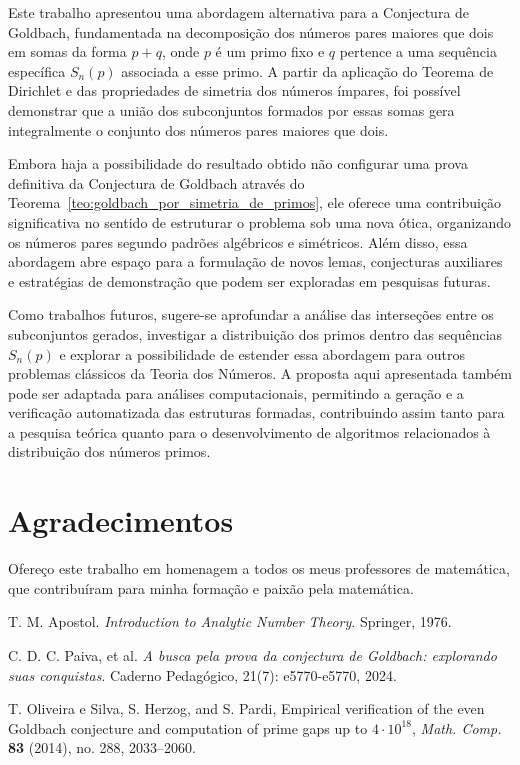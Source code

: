 \documentclass[a4paper,11pt]{article}
\theoremstyle{definition}
\theoremstyle{remark}
\begin{document}
\begin{otherlanguage}{brazil}
	Este trabalho apresentou uma abordagem alternativa para a Conjectura de Goldbach, fundamentada na decomposição dos números pares maiores que dois em somas da forma \(p + q\), onde \(p\) é um primo fixo e \(q\) pertence a uma sequência específica \(S_n(p)\) associada a esse primo. A partir da aplicação do Teorema de Dirichlet e das propriedades de simetria dos números ímpares, foi possível demonstrar que a união dos subconjuntos formados por essas somas gera integralmente o conjunto dos números pares maiores que dois.
	
	Embora haja a possibilidade do resultado obtido não configurar uma prova definitiva da Conjectura de Goldbach através do Teorema~\ref{teo:goldbach_por_simetria_de_primos}, ele oferece uma contribuição significativa no sentido de estruturar o problema sob uma nova ótica, organizando os números pares segundo padrões algébricos e simétricos. Além disso, essa abordagem abre espaço para a formulação de novos lemas, conjecturas auxiliares e estratégias de demonstração que podem ser exploradas em pesquisas futuras.
	
	Como trabalhos futuros, sugere-se aprofundar a análise das interseções entre os subconjuntos gerados, investigar a distribuição dos primos dentro das sequências \(S_n(p)\) e explorar a possibilidade de estender essa abordagem para outros problemas clássicos da Teoria dos Números. A proposta aqui apresentada também pode ser adaptada para análises computacionais, permitindo a geração e a verificação automatizada das estruturas formadas, contribuindo assim tanto para a pesquisa teórica quanto para o desenvolvimento de algoritmos relacionados à distribuição dos números primos.
	
	
	\section*{Agradecimentos}
	
	Ofereço este trabalho em homenagem a todos os meus professores de matemática, que contribuíram para minha formação e paixão pela matemática.
	
	\end{otherlanguage}
	\begin{thebibliography}{9}
		
		T. M. Apostol.
		\textit{Introduction to Analytic Number Theory}.
		Springer, 1976.
		
		C. D. C. Paiva, et al. \textit{A busca pela prova da conjectura de Goldbach: explorando suas conquistas}. Caderno Pedagógico, 21(7): e5770-e5770, 2024.
		
		T. Oliveira e Silva, S. Herzog, and S. Pardi,
		Empirical verification of the even Goldbach conjecture and computation of prime gaps up to \(4 \cdot 10^{18}\),
		\textit{Math. Comp.} \textbf{83} (2014), no. 288, 2033--2060.
		
		
		
		
		
	\end{thebibliography}
	
\end{document}
